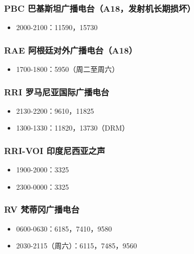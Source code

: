 \documentclass[12pt,UTF8]{ctexbook}
\begin{document}
\subsubsection{PBC 巴基斯坦广播电台（A18，发射机长期损坏）}

\begin{itemize}[leftmargin=2cm]
    \item 2000-2100：11590，15730
\end{itemize}

\subsubsection{RAE 阿根廷对外广播电台（A18）}

\begin{itemize}[leftmargin=2cm]
    \item 1700-1800：5950（周二至周六）
\end{itemize}

\subsubsection{RRI 罗马尼亚国际广播电台}

\begin{itemize}[leftmargin=2cm]
    \item 2130-2200：9610，11825
    \item 1300-1330：11820，13730（DRM）
\end{itemize}

\subsubsection{RRI-VOI 印度尼西亚之声}

\begin{itemize}[leftmargin=2cm]
    \item 1900-2000：3325
    \item 2300-0000：3325
\end{itemize}

\subsubsection{RV 梵蒂冈广播电台}

\begin{itemize}[leftmargin=2cm]
    \item 0600-0630：6185，7410，9580
    \item 2030-2115（周六）：6115，7485，9560
\end{itemize}
\end{document}
